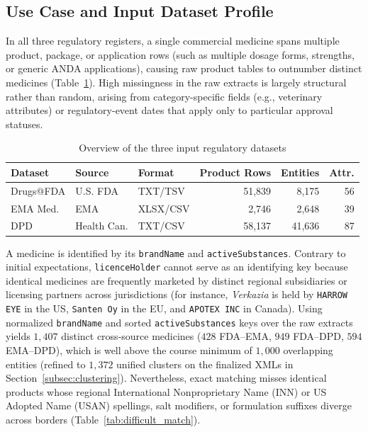 \documentclass{llncs}
\begin{document}
\subsection{Use Case and Input Dataset Profile}

In all three regulatory registers, a single commercial medicine spans multiple product, package, or application rows (such as multiple dosage forms, strengths, or generic ANDA applications), causing raw product tables to outnumber distinct medicines (Table~\ref{tab:datasets}). High missingness in the raw extracts is largely structural rather than random, arising from category-specific fields (e.g., veterinary attributes) or regulatory-event dates that apply only to particular approval statuses.

\begin{table}[htbp]
\centering
\caption{Overview of the three input regulatory datasets}
\label{tab:datasets}
\scriptsize
\setlength{\tabcolsep}{4pt}
\begin{tabular}{|l|l|l|r|r|r|}
\hline
\textbf{Dataset} & \textbf{Source} & \textbf{Format} & \textbf{Product Rows} & \textbf{Entities} & \textbf{Attr.} \\
\hline
Drugs@FDA & U.S. FDA    & TXT/TSV  & 51,839 &  8,175 & 56 \\
EMA Med.   & EMA         & XLSX/CSV &  2,746 &  2,648 & 39 \\
DPD        & Health Can. & TXT/CSV  & 58,137 & 41,636 & 87 \\
\hline
\end{tabular}
\end{table}

\label{subsec:entity_id}
A medicine is identified by its \texttt{brandName} and \texttt{activeSubstances}. Contrary to initial expectations, \texttt{licenceHolder} cannot serve as an identifying key because identical medicines are frequently marketed by distinct regional subsidiaries or licensing partners across jurisdictions (for instance, \textit{Verkazia} is held by \texttt{HARROW EYE} in the US, \texttt{Santen Oy} in the EU, and \texttt{APOTEX INC} in Canada). Using normalized \texttt{brandName} and sorted \texttt{activeSubstances} keys over the raw extracts yields $1{,}407$ distinct cross-source medicines ($428$ FDA--EMA, $949$ FDA--DPD, $594$ EMA--DPD), which is well above the course minimum of $1{,}000$ overlapping entities (refined to $1{,}372$ unified clusters on the finalized XMLs in Section~\ref{subsec:clustering}). Nevertheless, exact matching misses identical products whose regional International Nonproprietary Name (INN) or US Adopted Name (USAN) spellings, salt modifiers, or formulation suffixes diverge across borders (Table~\ref{tab:difficult_match}).
\end{document}
